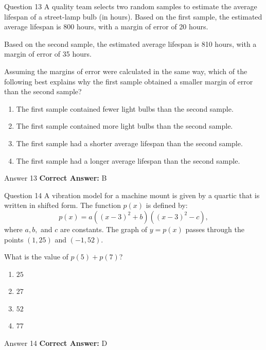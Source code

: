 \documentclass{beamer}
\begin{document}
\begin{frame}{Question 13}
\small
A quality team selects two random samples to estimate the average lifespan of a street-lamp bulb (in hours). Based on the first sample, the estimated average lifespan is 800 hours, with a margin of error of 20 hours.

Based on the second sample, the estimated average lifespan is 810 hours, with a margin of error of 35 hours.

Assuming the margins of error were calculated in the same way, which of the following best explains why the first sample obtained a smaller margin of error than the second sample?
\vspace{0.35cm}
\begin{enumerate}
    \item[A.] The first sample contained fewer light bulbs than the second sample.
    \item[B.] The first sample contained more light bulbs than the second sample.
    \item[C.] The first sample had a shorter average lifespan than the second sample.
    \item[D.] The first sample had a longer average lifespan than the second sample.
\end{enumerate}
\end{frame}
\begin{frame}{Answer 13}
\small
\textbf{Correct Answer:} B
\end{frame}

\begin{frame}{Question 14}
\small
A vibration model for a machine mount is given by a quartic that is written in shifted form. The function \(p(x)\) is defined by:
\[
p(x) = a((x - 3)^2 + b)((x - 3)^2 - c),
\]
where \(a, b,\) and \(c\) are constants. The graph of \(y = p(x)\) passes through the points \((1, 25)\) and \((-1, 52)\).

What is the value of \(p(5) + p(7)\)?
\vspace{0.35cm}
\begin{enumerate}
    \item[A.] \(25\)
    \item[B.] \(27\)
    \item[C.] \(52\)
    \item[D.] \(77\)
\end{enumerate}
\end{frame}
\begin{frame}{Answer 14}
\small
\textbf{Correct Answer:} D
\end{frame}
\end{document}
